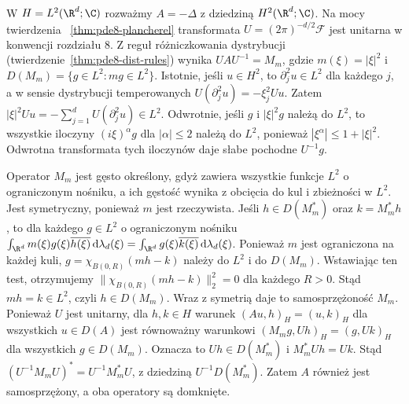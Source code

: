 \begin{kontrprzyklad}
\label{ex:pde12-unbounded-domain}
W $H=L^2(\R^d;\C)$ rozważmy $A=-\Delta$ z dziedziną
$H^2(\R^d;\C)$. Na mocy twierdzenia
~\ref{thm:pde8-plancherel} transformata
$U=(2\pi)^{-d/2}\mathcal F$ jest unitarna w konwencji
rozdziału 8. Z reguł różniczkowania dystrybucji
(twierdzenie~\ref{thm:pde8-dist-rules}) wynika
$UAU^{-1}=M_m$, gdzie $m(\xi)=|\xi|^2$ i
$D(M_m)=\{g\in L^2:mg\in L^2\}$.
Istotnie, jeśli $u\in H^2$, to $\partial_j^2u\in L^2$
dla każdego $j$, a w sensie dystrybucji temperowanych
$U(\partial_j^2u)=-\xi_j^2Uu$.
Zatem $|\xi|^2Uu=-\sum_{j=1}^d U(\partial_j^2u)\in L^2$.
Odwrotnie, jeśli $g$ i $|\xi|^2 g$ należą do $L^2$,
to wszystkie iloczyny $(i\xi)^\alpha g$ dla
$|\alpha|\le2$ należą do $L^2$, ponieważ
$|\xi^\alpha|\le 1+|\xi|^2$. Odwrotna transformata
tych iloczynów daje słabe pochodne $U^{-1}g$.

Operator $M_m$ jest gęsto określony, gdyż zawiera
wszystkie funkcje $L^2$ o ograniczonym nośniku, a ich
gęstość wynika z obcięcia do kul i zbieżności w $L^2$.
Jest symetryczny, ponieważ $m$ jest rzeczywista.
Jeśli $h\in D(M_m^*)$ oraz $k=M_m^*h$, to dla każdego
$g\in L^2$ o ograniczonym nośniku
$\int_{\R^d}m(\xi)g(\xi)\overline{h(\xi)}\,\mathrm d\lambda_d(\xi)
=\int_{\R^d}g(\xi)\overline{k(\xi)}\,\mathrm d\lambda_d(\xi)$.
Ponieważ $m$ jest ograniczona na każdej kuli,
$g=\chi_{B(0,R)}(mh-k)$ należy do $L^2$
i do $D(M_m)$. Wstawiając ten test, otrzymujemy
$\|\chi_{B(0,R)}(mh-k)\|_2^2=0$ dla każdego $R>0$.
Stąd $mh=k\in L^2$, czyli $h\in D(M_m)$.
Wraz z symetrią daje to samosprzężoność $M_m$.
Ponieważ $U$ jest unitarny, dla $h,k\in H$
warunek $(Au,h)_H=(u,k)_H$ dla wszystkich $u\in D(A)$
jest równoważny warunkowi
$(M_m g,Uh)_H=(g,Uk)_H$ dla wszystkich $g\in D(M_m)$.
Oznacza to $Uh\in D(M_m^*)$ i $M_m^*Uh=Uk$.
Stąd $(U^{-1}M_mU)^*=U^{-1}M_m^*U$, z dziedziną
$U^{-1}D(M_m^*)$. Zatem $A$ również jest samosprzężony,
a oba operatory są domknięte.


\end{kontrprzyklad}
